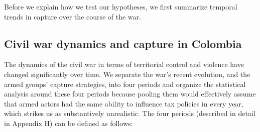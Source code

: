 Before we explain how we test our hypotheses, we first summarize temporal trends in capture over the course of the war. 
	
\subsection{Civil war dynamics and capture in Colombia}

The dynamics of the civil war in terms of territorial control and violence have changed significantly over time. We separate the war's recent evolution, and the armed groups' capture strategies, into four periods and organize the statistical analysis around these four periods because pooling them would effectively assume that armed actors had the same ability to influence tax policies in every year, which strikes us as substantively unrealistic. The four periods (described in detail in Appendix H) can be defined as follows: 

